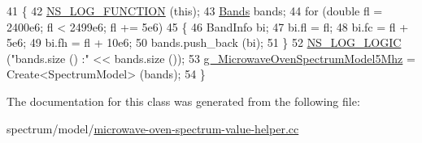 \begin{DoxyCode}
41   \{
42     \hyperlink{log-macros-disabled_8h_a90b90d5bad1f39cb1b64923ea94c0761}{NS\_LOG\_FUNCTION} (\textcolor{keyword}{this});
43     \hyperlink{namespacens3_a46ac9188e5cf43bd5292f7b67451246e}{Bands} bands;
44     \textcolor{keywordflow}{for} (\textcolor{keywordtype}{double} fl = 2400e6; fl < 2499e6; fl += 5e6)
45       \{
46         BandInfo bi;
47         bi.fl = fl;
48         bi.fc = fl + 5e6;
49         bi.fh = fl + 10e6;
50         bands.push\_back (bi);
51       \}
52     \hyperlink{group__logging_ga88acd260151caf2db9c0fc84997f45ce}{NS\_LOG\_LOGIC} (\textcolor{stringliteral}{"bands.size () :"} << bands.size ());
53     \hyperlink{namespacens3_ace6768337a854314ae7b25dde4253776}{g\_MicrowaveOvenSpectrumModel5Mhz} = Create<SpectrumModel> (bands);
54   \}
\end{DoxyCode}


The documentation for this class was generated from the following file\+:\begin{DoxyCompactItemize}
\item 
spectrum/model/\hyperlink{microwave-oven-spectrum-value-helper_8cc}{microwave-\/oven-\/spectrum-\/value-\/helper.\+cc}\end{DoxyCompactItemize}
